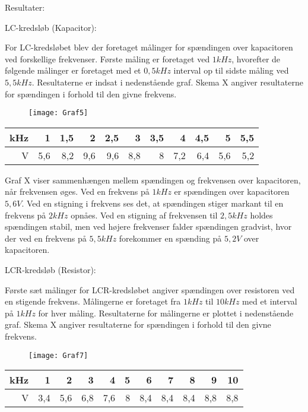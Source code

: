 Resultater:

LC-kredsløb (Kapacitor):

For LC-kredsløbet blev der foretaget målinger for spændingen over kapacitoren ved forskellige frekvenser. Første måling er foretaget ved $1 kHz$, hvorefter de følgende målinger er foretaget med et $0,5 kHz$ interval op til sidste måling ved $5,5 kHz$. Resultaterne er indsat i nedenstående graf. Skema X angiver resultaterne for spændingen i forhold til den givne frekvens.

\begin{figure}[H]
\texttt{[image: Graf5]}
\end{figure}

\begin{tabular}{|r|r|r|r|r|r|r|r|r|r|r|} \hline
kHz & 1 & 1,5 & 2 & 2,5 & 3 & 3,5 & 4 & 4,5 & 5 & 5,5 \\ \hline
V & 5,6 & 8,2 & 9,6 & 9,6 & 8,8 & 8 & 7,2 & 6,4 & 5,6 & 5,2 \\ \hline
\end{tabular}

Graf X viser sammenhængen mellem spændingen og frekvensen over kapacitoren, når frekvensen øges. Ved en frekvens på $1 kHz$ er spændingen over kapacitoren $5,6 V$. Ved en stigning i frekvens ses det, at spændingen stiger markant til en frekvens på $2 kHz$ opnåes. Ved en stigning af frekvensen til $2,5 kHz$ holdes spændingen stabil, men ved højere frekvenser falder spændingen gradvist, hvor der ved en frekvens på $5,5 kHz$ forekommer en spænding på $5,2 V$ over kapacitoren.

LCR-kredsløb (Resistor):

Første sæt målinger for LCR-kredsløbet angiver spændingen over resistoren ved en stigende frekvens. Målingerne er foretaget fra $1 kHz$ til $10 kHz$ med et interval på $1 kHz$ for hver måling. Resultaterne for målingerne er plottet i nedenstående graf. Skema X angiver resultaterne for spændingen i forhold til den givne frekvens.

\begin{figure}[H]
\texttt{[image: Graf7]}
\end{figure}

\begin{tabular}{|r|r|r|r|r|r|r|r|r|r|r|} \hline
kHz & 1 & 2 & 3 & 4 & 5 & 6 & 7 & 8 & 9 & 10 \\ \hline
V & 3,4 & 5,6 & 6,8 & 7,6 & 8 & 8,4 & 8,4 & 8,4 & 8,8 & 8,8 \\ \hline
\end{tabular}

